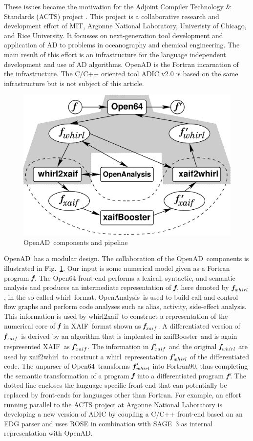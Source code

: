 \documentclass[11pt]{article}
\newcommand{\OpenAD}{OpenAD}
\newcommand{\OpenAnalysis}{OpenAnalysis}
\newcommand{\OpenSixtyFour}{Open64}
\newcommand{\xaif}{XAIF}
\newcommand{\xaifBooster}{xaifBooster}
\newcommand{\whirl}{whirl}
\newcommand{\whirlToxaif}{whirl2xaif}
\newcommand{\xaifTowhirl}{xaif2whirl}
\newcommand{\bmf}{\mbox{\bf\em f}}
\newcommand{\bmfp}{\mbox{\bf\em f$\,^\prime\!\!$}}
\newcommand{\reffig}[1]{{Fig.~\ref{#1}}}
\begin{document}
These issues became the motivation for the 
Adjoint Compiler Technology \& Standards (ACTS) project \cite{actsWeb}.
This project is a collaborative
research and development effort of MIT, Argonne National Laboratory, 
Univeristy of Chicago, and Rice University. 
It focusses on  next-generation tool development and 
application of AD to problems in oceanography and chemical engineering.
The main result of this effort is an infrastructure for the language independent 
development and use of AD algorithms. 
\OpenAD \cite{openadWeb}
is the Fortran incarnation of the infrastructure.
The C/C++ oriented tool ADIC v2.0 \cite{adicWeb}
is based on the same infrastructure but is 
not subject of this article.
\begin{figure}
\centering\includegraphics[width=.5\textwidth]{overview}
\caption{\OpenAD\ components and pipeline} \label{fig:overview}
\end{figure}
\OpenAD\ has  a modular design. 
The collaboration  of the \OpenAD\ components is illustrated in 
\reffig{fig:overview}.
Our input is some numerical model given as a Fortran program 
$\bmf$.
The \OpenSixtyFour\cite{open64Web}
front-end performs a lexical, 
syntactic, and semantic analysis and produces an 
intermediate representation of $\bmf$, here denoted by $\bmf_{\whirl}$, 
in the so-called \whirl\ format.
\OpenAnalysis\ is used to build call and control flow graphs and  perform 
code analyses such as alias, activity, side-effect analysis.
This information is used by 
\whirlToxaif\ to construct a representation of the numerical core of $\bmf$ in
\xaif\ format shown as $\bmf_{xaif}$.  
A differentiated version of $\bmf_{xaif}$ is derived by an 
algorithm that is implented in \xaifBooster\ and is again respresented 
\xaif\ as $\bmfp_{xaif}$.
The information in $\bmfp_{xaif}$ and the original $\bmf_{\whirl}$ are used by 
\xaifTowhirl\ to construct a 
\whirl\ representation $\bmfp_{\whirl}$ of the differentiated code. 
The unparser of 
\OpenSixtyFour\ transforms $\bmfp_{\whirl}$ into Fortran90, thus completing
the semantic transformation of a program $\bmf$ into
a differentiated program $\bmfp$.
The dotted line encloses the language specific front-end that can potentially
be replaced by front-ends for languages other than Fortran. 
For example, an 
effort running parallel to the ACTS project at Argonne National Laboratory is 
developing a new version of ADIC \cite{HoNo01} by coupling a C/C++ 
front-end 
based on an EDG parser \cite{edgWeb} and uses ROSE in combination with SAGE~3 \cite{roseWeb} 
as internal representation with \OpenAD.
\end{document}
